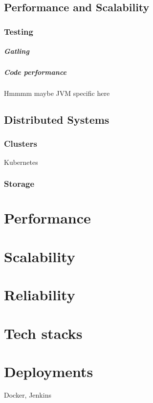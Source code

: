 \documentclass[a4paper, 11pt]{book}
\begin{document}
    \section{Performance and Scalability}

    \subsection{Testing}

    \paragraph{Gatling}

    \paragraph{Code performance}
    Hmmmm maybe JVM specific here

    \section{Distributed Systems}

    \subsection{Clusters}
    Kubernetes

    \subsection{Storage}


    \chapter{Performance}


    \chapter{Scalability}


    \chapter{Reliability}


    \chapter{Tech stacks}


    \chapter{Deployments}
    Docker, Jenkins
\end{document}
